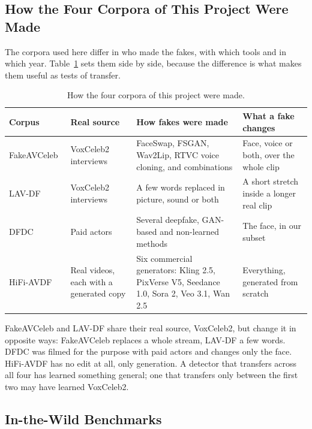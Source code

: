 \subsection{How the Four Corpora of This Project Were Made}

The corpora used here differ in who made the fakes, with which tools and in
which year. Table~\ref{tab:corpusmaking} sets them side by side, because the
difference is what makes them useful as tests of transfer.

\begin{table}[ht]
    \centering
    \small
    \caption{How the four corpora of this project were made.}
    \label{tab:corpusmaking}
    \begin{tabularx}{\textwidth}{@{}l >{\raggedright\arraybackslash}X >{\raggedright\arraybackslash}X >{\raggedright\arraybackslash}X@{}}
        \toprule
        \textbf{Corpus} & \textbf{Real source} & \textbf{How fakes were made} & \textbf{What a fake changes} \\
        \midrule
        FakeAVCeleb~\cite{fakeavceleb} & VoxCeleb2 interviews & FaceSwap, FSGAN, Wav2Lip, RTVC voice cloning, and combinations & Face, voice or both, over the whole clip \\
        LAV-DF~\cite{lavdf} & VoxCeleb2 interviews & A few words replaced in picture, sound or both & A short stretch inside a longer real clip \\
        DFDC~\cite{dfdc} & Paid actors & Several deepfake, GAN-based and non-learned methods & The face, in our subset \\
        HiFi-AVDF~\cite{havic} & Real videos, each with a generated copy & Six commercial generators: Kling 2.5, PixVerse V5, Seedance 1.0, Sora 2, Veo 3.1, Wan 2.5 & Everything, generated from scratch \\
        \bottomrule
    \end{tabularx}
\end{table}

FakeAVCeleb and LAV-DF share their real source, VoxCeleb2, but change it in
opposite ways: FakeAVCeleb replaces a whole stream, LAV-DF a few words. DFDC
was filmed for the purpose with paid actors and changes only the face.
HiFi-AVDF has no edit at all, only generation. A detector that transfers
across all four has learned something general; one that transfers only
between the first two may have learned VoxCeleb2.

\subsection{In-the-Wild Benchmarks}


